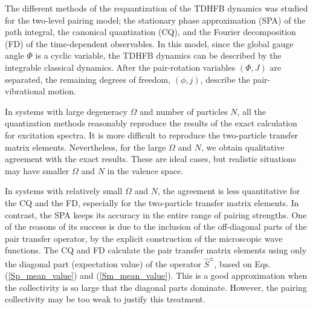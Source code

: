\documentclass[%
superscriptaddress,
preprint,
showpacs,
nofootinbib,
amsmath,amssymb,
aps,
prc,
floatfix ]%
{revtex4-1}
\begin{document}
The different methods of the requantization of the TDHFB dynamics
was studied for the two-level pairing model;
the stationary phase approximation (SPA) of the path integral,
the canonical quantization (CQ), and the Fourier decomposition (FD)
of the time-dependent observables.
In this model, since the global gauge angle $\Phi$ is a cyclic variable,
the TDHFB dynamics can be described by the integrable classical dynamics.
After the pair-rotation variables $(\Phi,J)$ are separated,
the remaining degrees of freedom, $(\phi,j)$, describe
the pair-vibrational motion.

In systems with large degeneracy $\Omega$ and number of particles $N$,
all the quantization methods reasonably reproduce the results of the
exact calculation for excitation spectra.
It is more difficult to reproduce the two-particle transfer matrix elements.
Nevertheless, for the large $\Omega$ and $N$,
we obtain qualitative agreement with the exact results.
These are ideal cases,
but realistic situations may have smaller $\Omega$ and $N$
in the valence space.

In systems with relatively small $\Omega$ and $N$,
the agreement is less quantitative for the CQ and the FD,
especially for the two-particle transfer matrix elements.
In contrast, the SPA keeps its accuracy in the entire range of
pairing strengths.
One of the reasons of its success is due to the inclusion of the off-diagonal 
parts of the pair transfer operator,
by the explicit construction of the microscopic wave functions.
The CQ and FD calculate the pair transfer matrix elements using only
the diagonal part (expectation value) of the operator $\hat{S}^\pm$,
based on Eqs. (\ref{Sp_mean_value}) and (\ref{Sm_mean_value}).
This is a good approximation when the collectivity is so large that the
diagonal parts dominate.
However, the pairing collectivity may be too weak to justify this
treatment.

\end{document}
